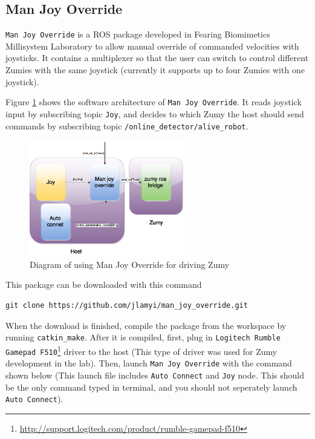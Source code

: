 \documentclass{article}
\begin{document}
\subsection{Man Joy Override}
\verb=Man Joy Override= is a ROS package developed in Fearing Biomimetics Millisystem Laboratory to allow manual override of commanded velocities with joysticks. It contains a multiplexer so that the user can switch to control different Zumies with the same joystick (currently it supports up to four Zumies with one joystick). 

Figure \ref{fig:mjo} shows the software architecture of \verb=Man Joy Override=. It reads joystick input by subscribing topic \verb=Joy=, and decides to which Zumy the host should send commands by subscribing topic \verb=/online_detector/alive_robot=.

\begin{figure}[h]
\centering
\includegraphics[width=0.6\textwidth]{img/ZumyROS.png}
\caption{Diagram of using Man Joy Override for driving Zumy}
\label{fig:mjo}
\end{figure}

This package can be downloaded with this command

\begin{Verbatim}[frame=single]
git clone https://github.com/jlamyi/man_joy_override.git
\end{Verbatim}

When the download is finished, compile the package from the workspace by running \verb=catkin_make=. After it is compiled, first, plug in \verb=Logitech Rumble Gamepad F510=\footnote{\url{http://support.logitech.com/product/rumble-gamepad-f510}} driver to the host (This type of driver was used for Zumy development in the lab). Then, launch \verb=Man Joy Override= with the command shown below (This launch file includes \verb=Auto Connect= and \verb=Joy= node. This should be the only command typed in terminal, and you should not seperately launch \verb=Auto Connect=).
\end{document}
